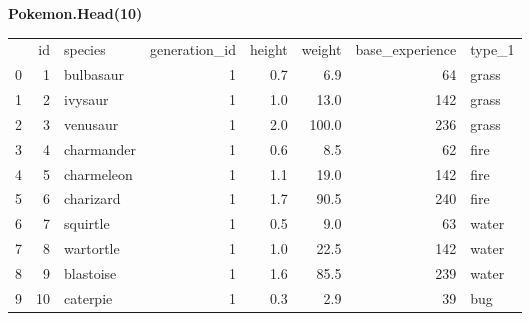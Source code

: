 \newpage
\textbf{Pokemon.Head(10)}
\begin{center}
	\begin{tabular}{lrlrrrrl}
		{} &  id &     species &  generation\_id &  height &  weight &  base\_experience & type\_1 \\
		0 &   1 &   bulbasaur &              1 &     0.7 &     6.9 &               64 &  grass \\
		1 &   2 &     ivysaur &              1 &     1.0 &    13.0 &              142 &  grass \\
		2 &   3 &    venusaur &              1 &     2.0 &   100.0 &              236 &  grass \\
		3 &   4 &  charmander &              1 &     0.6 &     8.5 &               62 &   fire \\
		4 &   5 &  charmeleon &              1 &     1.1 &    19.0 &              142 &   fire \\
		5 &   6 &   charizard &              1 &     1.7 &    90.5 &              240 &   fire \\
		6 &   7 &    squirtle &              1 &     0.5 &     9.0 &               63 &  water \\
		7 &   8 &   wartortle &              1 &     1.0 &    22.5 &              142 &  water \\
		8 &   9 &   blastoise &              1 &     1.6 &    85.5 &              239 &  water \\
		9 &  10 &    caterpie &              1 &     0.3 &     2.9 &               39 &    bug \\
	\end{tabular}
\end{center}
